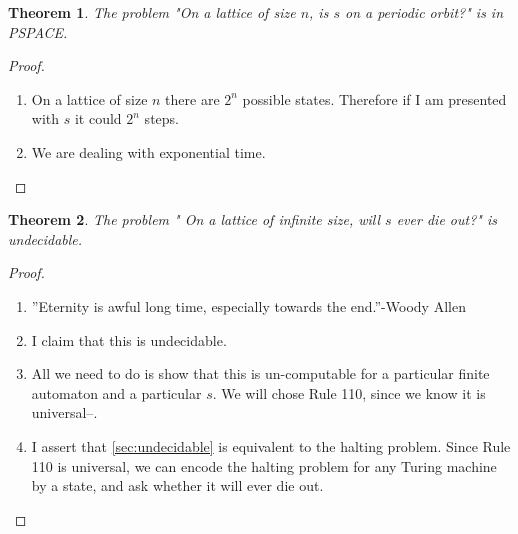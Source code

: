 \documentclass[]{article}
\newtheorem{thm}{Theorem}
\begin{document}
\begin{thm}
	The problem "On a lattice of size $n$, is $s$ on a periodic orbit?" is in PSPACE.
\end{thm}

\begin{proof}
			\begin{enumerate}
		\item On a lattice of size $n$ there are $2^n$ possible states. Therefore if I am presented with $s$ it could  $2^n$ steps.
		\item We are dealing with exponential time. 
	\end{enumerate}
\end{proof}

\begin{thm}
	The problem " On a lattice of infinite size, will $s$ ever die out?" is undecidable.
\end{thm}

\begin{proof}
		\begin{enumerate}
		\item ''Eternity is awful long time, especially towards the end.''-Woody Allen
		\item I claim that this is undecidable\label{sec:undecidable}.
		\item All we need to do is show that this is un-computable for a particular finite automaton and a particular $s$. We will chose Rule 110, since we know it is universal--\cite{cook2004universality}.
		\item  I assert that \ref{sec:undecidable} is equivalent to the halting problem. Since Rule 110 is universal, we can encode the halting problem for any Turing machine by a state, and ask whether it will ever die out. 
	\end{enumerate}
\end{proof}





\raggedright
{}

\end{document}
